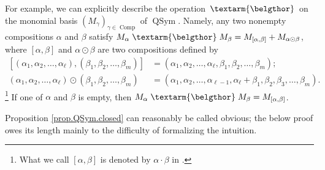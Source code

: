 \documentclass
[numbers=enddot,12pt,final,onecolumn,notitlepage,abstracton]{scrartcl}%
\theoremstyle{definition}
\newenvironment{verlong}{}{}
\newcommand{\bel}{\left. \textarm{\belgthor} \right.}
\begin{document}
\begin{verlong}
For example, we can explicitly describe the operation $\bel $ on the monomial
basis $\left(  M_{\gamma}\right)  _{\gamma\in\operatorname*{Comp}}$ of
$\operatorname*{QSym}$. Namely, any two nonempty compositions $\alpha$ and
$\beta$ satisfy $M_{\alpha} \bel M_{\beta}=M_{\left[  \alpha,\beta\right]
}+M_{\alpha\odot\beta}$, where $\left[  \alpha,\beta\right]  $ and
$\alpha\odot\beta$ are two compositions defined by%
\begin{align*}
\left[  \left(  \alpha_{1},\alpha_{2},\ldots,\alpha_{\ell}\right)  ,\left(
\beta_{1},\beta_{2},\ldots,\beta_{m}\right)  \right]   &  =\left(  \alpha
_{1},\alpha_{2},\ldots,\alpha_{\ell},\beta_{1},\beta_{2},\ldots,\beta
_{m}\right)  ;\\
\left(  \alpha_{1},\alpha_{2},\ldots,\alpha_{\ell}\right)  \odot\left(
\beta_{1},\beta_{2},\ldots,\beta_{m}\right)   &  =\left(  \alpha_{1}%
,\alpha_{2},\ldots,\alpha_{\ell-1},\alpha_{\ell}+\beta_{1},\beta_{2},\beta
_{3},\ldots,\beta_{m}\right)  .
\end{align*}
\footnote{What we call $\left[  \alpha,\beta\right]  $ is denoted by
$\alpha\cdot\beta$ in \cite[before Proposition 5.1.7]{Reiner}.} If one of
$\alpha$ and $\beta$ is empty, then $M_{\alpha} \bel M_{\beta}=M_{\left[
\alpha,\beta\right]  }$.
\end{verlong}

Proposition \ref{prop.QSym.closed} can reasonably be called obvious; the below
proof owes its length mainly to the difficulty of formalizing the intuition.
\end{document}
